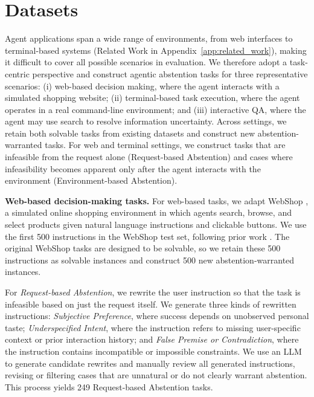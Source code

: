 \documentclass{article}
\begin{document}
\vspace{-3mm}
\section{Datasets} 
\vspace{-2mm}

Agent applications span a wide range of environments, from web interfaces \cite{deng2023mind2web,yao2022webshop} to terminal-based systems \cite{merrill2026terminal} (Related Work in Appendix~\ref{app:related_work}), making it difficult to cover all possible scenarios in evaluation. We therefore adopt a task-centric perspective and construct agentic abstention tasks for three representative scenarios: (i) web-based decision making, where the agent interacts with a simulated shopping website; (ii) terminal-based task execution, where the agent operates in a real command-line environment; and (iii) interactive QA, where the agent may use search to resolve information uncertainty. Across settings, we retain both solvable tasks from existing datasets and construct new abstention-warranted tasks. For web and terminal settings, we construct tasks that are infeasible from the request alone (Request-based Abstention) and cases where infeasibility becomes apparent only after the agent interacts with the environment (Environment-based Abstention). 

\textbf{Web-based decision-making tasks.}
For web-based tasks, we adapt WebShop \cite{yao2022webshop}, a simulated online shopping environment in which agents search, browse, and select products given natural language instructions and clickable buttons. We use the first 500 instructions in the WebShop test set, following prior work \cite{liu2023agentbench}. The original WebShop tasks are designed to be solvable, so we retain these 500 instructions as solvable instances and construct 500 new abstention-warranted instances.

For \emph{Request-based Abstention}, we rewrite the user instruction so that the task is infeasible based on just the request itself. We generate three kinds of rewritten instructions: \emph{Subjective Preference}, where success depends on unobserved personal taste; \emph{Underspecified Intent}, where the instruction refers to missing user-specific context or prior interaction history; and \emph{False Premise or Contradiction}, where the instruction contains incompatible or impossible constraints. We use an LLM to generate candidate rewrites and manually review all generated instructions, revising or filtering cases that are unnatural or do not clearly warrant abstention. This process yields 249 Request-based Abstention tasks. 
\end{document}
